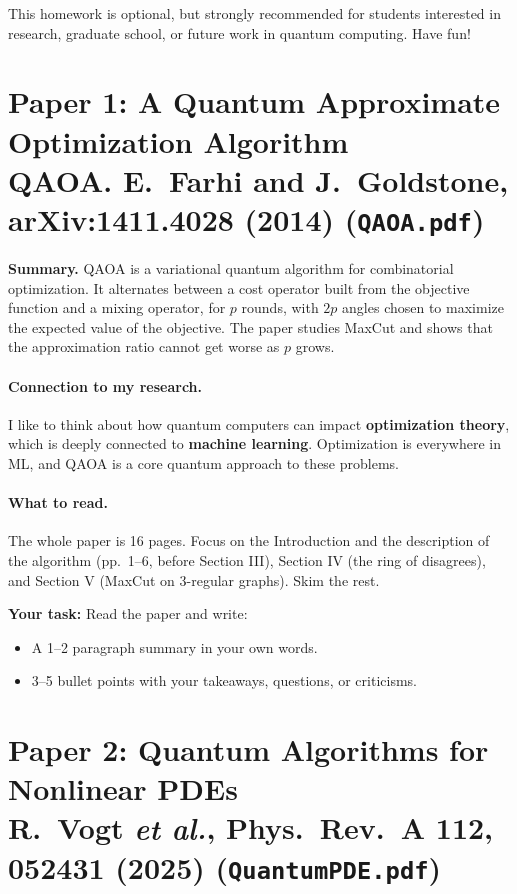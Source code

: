 \documentclass[11pt]{article}
\newenvironment{summary}{\par\noindent\textbf{Summary.} }{\par}
\newcommand{\yourtask}[1]{%
  \vspace{0.5em}
  \noindent\textbf{Your task:} #1
  \begin{itemize}
    \item A 1--2 paragraph summary in your own words.
    \item 3--5 bullet points with your takeaways, questions, or criticisms.
  \end{itemize}}
\begin{document}
\medskip
\noindent This homework is optional, but strongly recommended for students interested in research,
graduate school, or future work in quantum computing. Have fun! \smiley{}

\newpage

\section*{Paper 1: A Quantum Approximate Optimization Algorithm\\
\small{QAOA. E.~Farhi and J.~Goldstone, arXiv:1411.4028 (2014) \quad (\texttt{QAOA.pdf})}}

\begin{summary}
QAOA is a variational quantum algorithm for combinatorial optimization. It alternates between a
cost operator built from the objective function and a mixing operator, for $p$ rounds, with $2p$
angles chosen to maximize the expected value of the objective. The paper studies MaxCut and shows
that the approximation ratio cannot get worse as $p$ grows.
\end{summary}

\paragraph{Connection to my research.}
I like to think about how quantum computers can impact \textbf{optimization theory}, which is
deeply connected to \textbf{machine learning}. Optimization is everywhere in ML, and QAOA is a core
quantum approach to these problems. \smiley{}

\paragraph{What to read.}
The whole paper is 16 pages. Focus on the Introduction and the description of the
algorithm (pp.~1--6, before Section III), Section IV (the ring of
disagrees), and Section V (MaxCut on 3-regular graphs). Skim the rest.

\yourtask{Read the paper and write:}

\newpage

\section*{Paper 2: Quantum Algorithms for Nonlinear PDEs\\
\small{R.~Vogt \emph{et al.}, Phys.\ Rev.\ A \textbf{112}, 052431 (2025) \quad
(\texttt{QuantumPDE.pdf})}}
\end{document}
